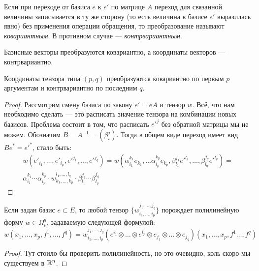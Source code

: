 \begin{definition}
	Если при переходе от базиса $e$ к $e'$ по матрице $A$ переход для связанной величины записывается в ту же сторону (то есть величина в базисе $e'$ выразилась явно) без применения операции обращения, то преобразование называют \textit{ковариантным}. В противном случае --- \textit{контрвариантным}.
\end{definition}

\begin{example}
	Базисные векторы преобразуются ковариантно, а координаты векторов --- контрвариантно.
\end{example}

\begin{proposition}
	Координаты тензора типа $(p, q)$ преобразуются ковариантно по первым $p$ аргументам и контрвариантно по последним $q$.
\end{proposition}

\begin{proof}
	Рассмотрим смену базиса по закону $e' = eA$ и тензор $w$. Всё, что нам необходимо сделать --- это расписать значение тензора на комбинации новых базисов. Проблема состоит в том, что расписать $e'^j$ без обратной матрицы мы не можем. Обозначим $B = A^{-1} = (\beta_i^j)$. Тогда в общем виде переход имеет вид $Be^* = e'^*$, стало быть:
	\begin{multline*}
		w(e'_{i_1}, \ldots, e'_{i_p}, e'^{j_1}, \ldots, e'^{j_q}) = w(\alpha_{i_1}^{k_1} e_{k_1}, \ldots \alpha_{i_p}^{k_p} e_{k_p}, \beta_{l_1}^{j_1} e'^{l_1}, \ldots, \beta_{l_q}^{j_q} e'^{l_q}) =
		\\
		\alpha_{i_1}^{k_1} \cdots \alpha_{i_p}^{k_p} \cdot w_{k_1, \ldots, k_p}^{l_1, \ldots, l_q} \cdot \beta_{l_1}^{j_1} \cdots \beta_{l_q}^{j_q}
	\end{multline*}
\end{proof}

\begin{proposition}
	Если задан базис $e \subset E$, то любой тензор $\{w_{i_1, \ldots, i_p}^{j_1, \ldots, j_q}\}$ порождает полилинейную форму $w \in \Omega_p^q$, задаваемую следующей формулой:
	\[
		w(x_1, \ldots, x_p, f^1, \ldots, f^q) = w_{i_1, \ldots, i_p}^{j_1, \ldots, j_q} (e^{i_1} \otimes \ldots \otimes e^{i_p} \otimes e_{j_1} \otimes \ldots \otimes e_{j_q})(x_1, \ldots, x_p, f^1 \ldots, f^q)
	\]
\end{proposition}

\begin{proof}
	Тут стоило бы проверить полилинейность, но это очевидно, коль скоро мы существуем в $\mathbb{R}^n$.
\end{proof}

